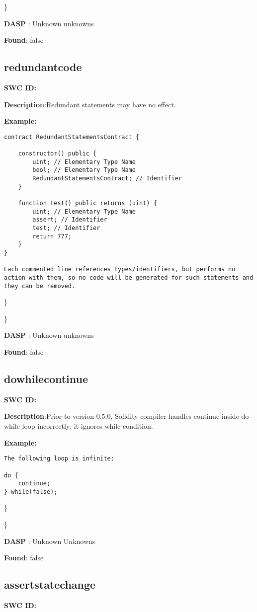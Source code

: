 \documentclass{article}
\begin{document}
\} 

\textbf{DASP} : Unknown unknowns

\textbf{Found}: false

\subsection{redundant\textunderscore code} 
\textbf{SWC \textunderscore ID:} 

\textbf{Description}:Redundant statements may have no effect.


\textbf{Example:} 
\begin{verbatim}
contract RedundantStatementsContract {

    constructor() public {
        uint; // Elementary Type Name
        bool; // Elementary Type Name
        RedundantStatementsContract; // Identifier
    }

    function test() public returns (uint) {
        uint; // Elementary Type Name
        assert; // Identifier
        test; // Identifier
        return 777;
    }
}

Each commented line references types/identifiers, but performs no action with them, so no code will be generated for such statements and they can be removed.

\end{verbatim}\} 

\} 

\textbf{DASP} : Unknown unknowns

\textbf{Found}: false

\subsection{do\textunderscore while\textunderscore continue} 
\textbf{SWC \textunderscore ID:} 

\textbf{Description}:Prior to version 0.5.0, Solidity compiler handles continue inside do-while loop incorrectly: it ignores while condition.


\textbf{Example:} 
\begin{verbatim}
The following loop is infinite:

do {
    continue;
} while(false);

\end{verbatim}\} 

\} 

\textbf{DASP} : Unknown Unknowns

\textbf{Found}: false

\subsection{assert\textunderscore state\textunderscore change} 
\textbf{SWC \textunderscore ID:} 
\end{document}
